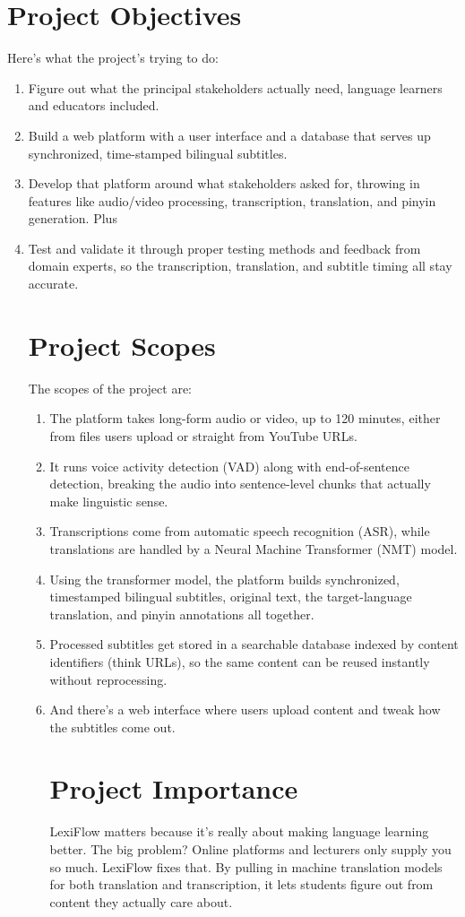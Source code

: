 \section{Project Objectives}\label{sec:obj}
Here's what the project's trying to do:
\begin{enumerate}[label= (\alph*)] \item Figure out what the principal stakeholders actually need, language learners and educators included. \item Build a web platform with a user interface and a database that serves up synchronized, time-stamped bilingual subtitles. \item Develop that platform around what stakeholders asked for, throwing in features like audio/video processing, transcription, translation, and pinyin generation. Plus \item Test and validate it through proper testing methods and feedback from domain experts, so the transcription, translation, and subtitle timing all stay accurate.
\section{Project Scopes}The scopes of the project are:
\begin{enumerate}[label= (\alph*)] \item The platform takes long-form audio or video, up to 120 minutes, either from files users upload or straight from YouTube URLs. \item It runs voice activity detection (VAD) along with end-of-sentence detection, breaking the audio into sentence-level chunks that actually make linguistic sense. \item Transcriptions come from automatic speech recognition (ASR), while translations are handled by a Neural Machine Transformer (NMT) model. \item Using the transformer model, the platform builds synchronized, timestamped bilingual subtitles, original text, the target-language translation, and pinyin annotations all together. \item Processed subtitles get stored in a searchable database indexed by content identifiers (think URLs), so the same content can be reused instantly without reprocessing. \item And there's a web interface where users upload content and tweak how the subtitles come out.
\section{Project Importance}LexiFlow matters because it's really about making language learning better. The big problem? Online platforms and lecturers only supply you so much. LexiFlow fixes that. By pulling in machine translation models for both translation and transcription, it lets students figure out from content they actually care about.

\end{enumerate}
\end{enumerate}

